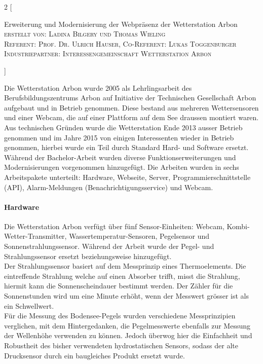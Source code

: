 \documentclass[10pt]{article}
\begin{document}
\begin{multicols}{2}
[
    \begin{center}
      {\huge\sffamily \Large Erweiterung und Modernisierung der Webpräsenz der Wetterstation Arbon}\\
       \vspace{2ex}
       \textsc{erstellt von: Ladina Bilgery und Thomas Wieling}\\
       \textsc{Referent: Prof. Dr. Ulrich Hauser, Co-Referent: Lukas Toggenburger}\\
       \textsc{Industriepartner: Interessengemeinschaft Wetterstation Arbon}      
    \end{center}
]

Die Wetterstation Arbon wurde 2005 als Lehrlingsarbeit des Berufsbildungszentrums Arbon auf Initiative der Technischen Gesellschaft Arbon aufgebaut und in Betrieb genommen. Diese bestand aus mehreren Wettersensoren und einer Webcam, die auf einer Plattform auf dem See draussen montiert waren. Aus technischen Gründen wurde die Wetterstation Ende 2013 ausser Betrieb genommen und im Jahre 2015 von einigen Interessenten wieder in Betrieb genommen, hierbei wurde ein Teil durch Standard Hard- und Software ersetzt. Während der Bachelor-Arbeit wurden diverse Funktionserweiterungen und Modernisierungen vorgenommen hinzugefügt. Die Arbeiten wurden in sechs Arbeitspakete unterteilt: Hardware, Webseite, Server, Programmierschnittstelle (API), Alarm-Meldungen (Benachrichtigungsservice) und Webcam.
\paragraph{Hardware}
Die Wetterstation Arbon verfügt über fünf Sensor-Einheiten: Webcam, Kombi-Wetter-Transmitter, Wassertemperatur-Sensoren, Pegelsensor und Sonnenstrahlungssensor. Während der Arbeit wurde der Pegel- und Strahlungssensor ersetzt beziehungsweise hinzugefügt.\\ 
Der Strahlungssensor basiert auf dem Messprinzip eines Thermoelements. Die eintreffende Strahlung welche auf einen Absorber trifft, misst die Strahlung, hiermit kann die Sonnenscheindauer bestimmt werden. Der Zähler für die Sonnenstunden wird um eine Minute erhöht, wenn der Messwert grösser ist als ein Schwellwert.\\
Für die Messung des Bodensee-Pegels wurden verschiedene Messprinzipien verglichen, mit dem Hintergedanken, die Pegelmesswerte ebenfalls zur Messung der Wellenhöhe verwenden zu können. Jedoch überwog hier die Einfachheit und Robustheit des bisher verwendeten hydrostatischen Sensors, sodass der alte Drucksensor durch ein baugleiches Produkt ersetzt wurde. 


\end{multicols}
\end{document}
